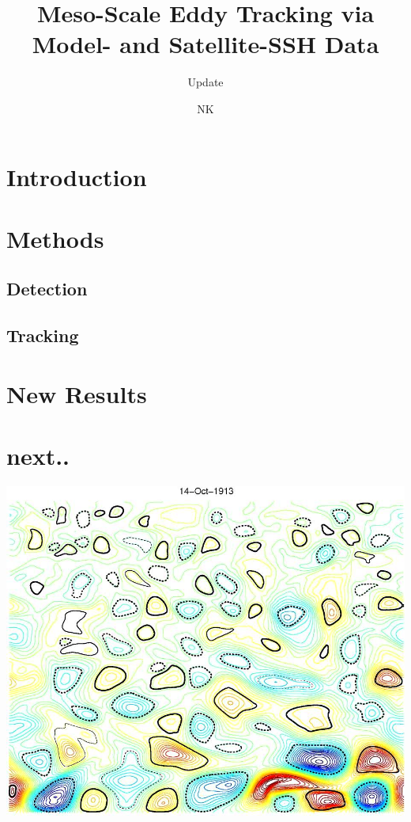 \documentclass{beamer}
\begin{document}
\title{Meso-Scale Eddy Tracking via Model- and Satellite-SSH Data}
\subtitle{Update}
\author{NK}
%
\section*{Introduction}

\section{Methods}
\subsection{Detection}

\subsection{Tracking}

\section{New Results}

\section{next..}


\begin{frame}
\begin{center}
\centering
\href{run:mplayer ./MOViq55RoL4MadShort.avi}{
\includegraphics[scale=0.25]{MOViq55RoL4MadShort.jpeg}}
\end{center}
\end{frame}
\end{document}
